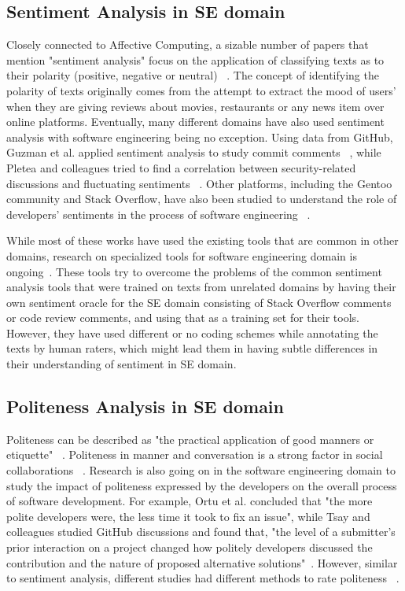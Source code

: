 \subsection{Sentiment Analysis in SE domain}\label{rwsent}
Closely connected to Affective Computing, a sizable number of papers that mention "sentiment analysis" focus on the application of classifying texts as to their polarity (positive, negative or neutral) ~\cite{pang2008opinion}. The concept of identifying the polarity of texts originally comes from the attempt to extract the mood of users' when they are giving reviews about movies, restaurants or any news item over online platforms. Eventually, many different domains have also used sentiment analysis with software engineering being no exception. Using data from GitHub, Guzman et al. applied sentiment analysis to study commit comments ~\cite{guzman2014sentiment}, while Pletea and colleagues tried to find a correlation between security-related discussions and fluctuating sentiments ~\cite{pletea2014security}. Other platforms, including the Gentoo community and Stack Overflow, have also been studied to understand the role of developers' sentiments in the process of software engineering ~\cite{garcia2013role,islam2016towards,guzman2013towards,novielli2014towards}.

While most of these works have used the existing tools that are common in other domains, research on specialized tools for software engineering domain is ongoing~\cite{calefato2017sentiment,ahmed2017senticr}. These tools try to overcome the problems of the common sentiment analysis tools that were trained on texts from unrelated domains by having their own sentiment oracle for the SE domain consisting of Stack Overflow comments or code review comments, and using that as a training set for their tools. However, they have used different or no coding schemes while annotating the texts by human raters, which might lead them in having subtle differences in their understanding of sentiment in SE domain.

\subsection{Politeness Analysis in SE domain}

Politeness can be described as "the practical application of good manners or etiquette" ~\cite{wiki:pol}. Politeness in manner and conversation is a strong factor in social collaborations ~\cite{ortu2015would,wang2008politeness}. Research is also going on in the software engineering domain to study the impact of politeness expressed by the developers on the overall process of software development. For example, Ortu et al. concluded that "the more polite developers were, the less time it took to fix an issue", while Tsay and colleagues studied GitHub discussions and found that, "the level of a submitter's prior interaction on a project changed how politely developers discussed the contribution and the nature of proposed alternative solutions"~\cite{ortu2015would,tsay2014let}. However, similar to sentiment analysis, different studies had different methods to rate politeness ~\cite{tsay2014let,brownsoftware}.


